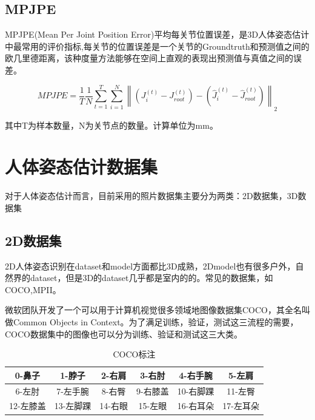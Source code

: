 \subsection{MPJPE}

MPJPE(Mean Per Joint Position Error)平均每关节位置误差，是3D人体姿态估计中最常用的评价指标,每关节的位置误差是一个关节的Groundtruth和预测值之间的欧几里德距离，该种度量方法能够在空间上直观的表现出预测值与真值之间的误差。

\begin{equation}
MPJPE = \frac{1}{T}\frac{1}{N}{\sum\limits_{t = 1}^T {\sum\limits_{i = 1}^N {\left\| {\left( {J_i^{\left( t \right)} - J_{root}^{\left( t \right)}} \right) - \left( {\widehat J_i^{\left( t \right)} - \widehat J_{root}^{\left( t \right)}} \right)} \right\|} } _2}
\end{equation}

其中T为样本数量，N为关节点的数量。计算单位为mm。

\section{人体姿态估计数据集}

对于人体姿态估计而言，目前采用的照片数据集主要分为两类：2D数据集，3D数据集

\subsection{2D数据集}

2D人体姿态识别在dataset和model方面都比3D成熟，2Dmodel也有很多户外，自然界的dataset，但是3D的dataset几乎都是室内的的。常见的数据集，如COCO,MPII。

微软团队开发了一个可以用于计算机视觉很多领域地图像数据集COCO，其全名叫做Common Objects in Context。为了满足训练，验证，测试这三流程的需要，COCO数据集中的图像也可以分为训练、验证和测试这三大类。

\begin{table}[h]
    \centering
    \begin{tabular}{c|c|c|c|c|c}
        \hline
         0-鼻子 &  1-脖子 & 2-右肩 & 3-右肘 & 4-右手腕 & 5-左肩\\
        \hline
         6-左肘 &  7-左手腕 & 8-右臀 & 9-右膝盖 & 10-右脚踝 & 11-左臀\\
        \hline
         12-左膝盖 &  13-左脚踝 & 14-右眼 & 15-左眼 & 16-右耳朵 & 17-左耳朵\\
        \hline
    \end{tabular}
    \caption{COCO标注}
    \label{COCO}
\end{table}

